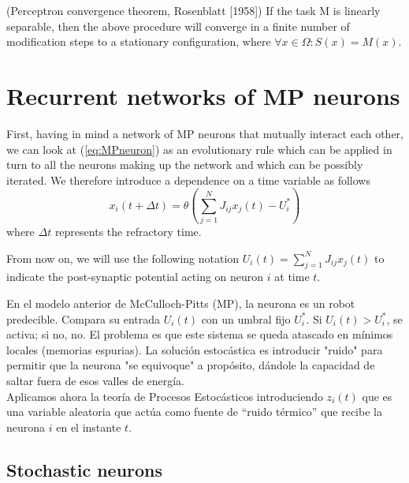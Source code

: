 \begin{teo}(Perceptron convergence theorem, Rosenblatt [1958])
    If the task M is linearly separable, then the above procedure will converge in a finite number of modification steps to a stationary configuration, where $\forall x \in \Omega : S(x) = M (x)$.
\end{teo}

\section{Recurrent networks of MP neurons}

\noindent
First, having in mind a network of MP neurons that mutually interact each other, we can look at (\ref{eq:MPneuron}) as an evolutionary rule which can be applied in turn to all the neurons making up the network and which can be possibly iterated. We therefore introduce a dependence on a time variable as follows
\begin{equation} \label{eq:recurrentMP}
    x_i (t + \Delta t) = \theta\left( \sum_{j=1}^{N} J_{ij} x_j (t) - U_i^* \right)
\end{equation}
where $\Delta t$ represents the refractory time.

\begin{notacion} 
    From now on, we will use the following notation $U_i(t)= \sum\limits_{j=1}^{N} J_{ij} x_j (t)$ to indicate the post-synaptic potential acting on neuron $i$ at time $t$. \\
\end{notacion}

\noindent
En el modelo anterior de McCulloch-Pitts (MP), la neurona es un robot predecible. Compara su entrada $U_i(t)$ con un umbral fijo $U_i^*$. Si $U_i(t) > U_i^*$, se activa; si no, no. El problema es que este sistema se queda atascado en mínimos locales (memorias espurias). La solución estocástica es introducir "ruido" para permitir que la neurona "se equivoque" a propósito, dándole la capacidad de saltar fuera de esos valles de energía. \\

\noindent 
Aplicamos ahora la teoría de Procesos Estocásticos introduciendo $z_i(t)$ que es una variable aleatoria que actúa como fuente de ``ruido térmico'' que recibe la neurona $i$ en el instante $t$. \\

\subsection{Stochastic neurons}

